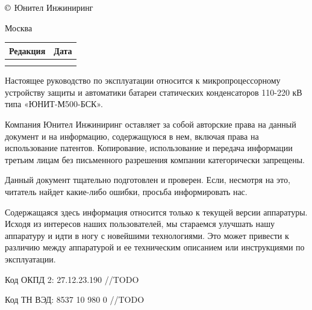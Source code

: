 \pagestyle{fancy}
\fancyhf{}
\renewcommand{\headrulewidth}{1pt}
\rhead{\colondevicetype}
\lhead{\color{black}{ЮТКБ.656122.609 РЭ6 Редакция \rev~от~\revdate}}
\rfoot{{\thepage}}
\renewcommand{\footrulewidth}{1pt}


\pagecolor{white}

\begin{flushleft}
\noindent
$\copyright$
\the\year{}
Юнител Инжиниринг

\vskip 3mm
Москва
\vskip 8mm

\setlength{\extrarowheight}{0.4cm} %
\begin{longtable}[l]{|>{\centering}m{4cm}|>{\centering\arraybackslash}m{4cm}|}%
    \hline
	Редакция & Дата \\
    \hline
	\textcolor{unigray}{\rev} & \textcolor{unigray}{\revdate} \\
    \hline  
    &  \\
    \hline 
                        
\end{longtable}

\vskip 70mm
\noindent
Настоящее руководство по эксплуатации относится к микропроцессорному устройству защиты и автоматики батареи статических конденсаторов 110-220 кВ типа «ЮНИТ-М500-БСК».

\vskip 10mm
Компания Юнител Инжиниринг оставляет за собой авторские права на данный документ и на информацию, содержащуюся в нем, включая права на использование патентов. Копирование, использование и передача информации третьим лицам без письменного разрешения компании категорически запрещены.

\vskip 10mm
Данный документ тщательно подготовлен и проверен. Если, несмотря на это, читатель найдет какие-либо ошибки, просьба информировать нас.

\vskip 10mm
Содержащаяся здесь информация относится только к текущей версии аппаратуры. Исходя из интересов наших пользователей, мы стараемся улучшать нашу аппаратуру и идти в ногу с новейшими технологиями. Это может привести к различию между аппаратурой и ее техническим описанием или инструкциями по эксплуатации.

\vskip 10mm
Код ОКПД 2: 27.12.23.190   \color{red}//TODO %

\vskip 5mm
Код ТН ВЭД: 8537 10 980 0  \color{red}//TODO %

\end{flushleft}